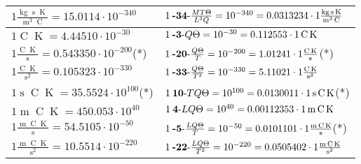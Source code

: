 \begin{center}
\begin{longtable}{l l}
{\color{black}$1 \bm{\mathrm{ }}\frac{\operatorname{kg}\operatorname{s}\operatorname{K}}{\operatorname{m}^3\operatorname{C}} = 15.0114\cdot10^{-340} $}&
	{\color{black}$1\:\text{\textbf{-34}-} \frac{MT\Theta}{L^3Q}=10^{-340} = 0.0313234 \cdot 1 \bm{\mathrm{ }}\frac{\operatorname{kg}\operatorname{s}\operatorname{K}}{\operatorname{m}^3\operatorname{C}}$}\\
\hline{\color{black}$1 \bm{\mathrm{ }}\operatorname{C}\operatorname{K} = 4.44510\cdot10^{-30} $}&
	{\color{black}$1\:\text{\textbf{-3}-} Q\Theta=10^{-30} = 0.112553 \cdot 1 \bm{\mathrm{ }}\operatorname{C}\operatorname{K}$}\\
{\color{black}$1 \bm{\mathrm{ }}\frac{\operatorname{C}\operatorname{K}}{\operatorname{s}} = 0.543350\cdot10^{-200} $}\quad(*)&
	{\color{black}$1\:\text{\textbf{-20}-} \frac{Q\Theta}{T}=10^{-200} = 1.01241 \cdot 1 \bm{\mathrm{ }}\frac{\operatorname{C}\operatorname{K}}{\operatorname{s}}$}\quad(*)\\
{\color{black}$1 \bm{\mathrm{ }}\frac{\operatorname{C}\operatorname{K}}{\operatorname{s}^2} = 0.105323\cdot10^{-330} $}&
	{\color{black}$1\:\text{\textbf{-33}-} \frac{Q\Theta}{T^2}=10^{-330} = 5.11021 \cdot 1 \bm{\mathrm{ }}\frac{\operatorname{C}\operatorname{K}}{\operatorname{s}^2}$}\\
{\color{black}$1 \bm{\mathrm{ }}\operatorname{s}\operatorname{C}\operatorname{K} = 35.5524\cdot10^{100} $}\quad(*)&
	{\color{black}$1\:\text{\textbf{10}-} TQ\Theta=10^{100} = 0.0130011 \cdot 1 \bm{\mathrm{ }}\operatorname{s}\operatorname{C}\operatorname{K}$}\quad(*)\\
{\color{black}$1 \bm{\mathrm{ }}\operatorname{m}\operatorname{C}\operatorname{K} = 450.053\cdot10^{40} $}&
	{\color{black}$1\:\text{\textbf{4}-} LQ\Theta=10^{40} = 0.00112353 \cdot 1 \bm{\mathrm{ }}\operatorname{m}\operatorname{C}\operatorname{K}$}\\
{\color{black}$1 \bm{\mathrm{ }}\frac{\operatorname{m}\operatorname{C}\operatorname{K}}{\operatorname{s}} = 54.5105\cdot10^{-50} $}&
	{\color{black}$1\:\text{\textbf{-5}-} \frac{LQ\Theta}{T}=10^{-50} = 0.0101101 \cdot 1 \bm{\mathrm{ }}\frac{\operatorname{m}\operatorname{C}\operatorname{K}}{\operatorname{s}}$}\quad(*)\\
{\color{black}$1 \bm{\mathrm{ }}\frac{\operatorname{m}\operatorname{C}\operatorname{K}}{\operatorname{s}^2} = 10.5514\cdot10^{-220} $}&
	{\color{black}$1\:\text{\textbf{-22}-} \frac{LQ\Theta}{T^2}=10^{-220} = 0.0505402 \cdot 1 \bm{\mathrm{ }}\frac{\operatorname{m}\operatorname{C}\operatorname{K}}{\operatorname{s}^2}$}\\

\end{longtable}
\end{center}
